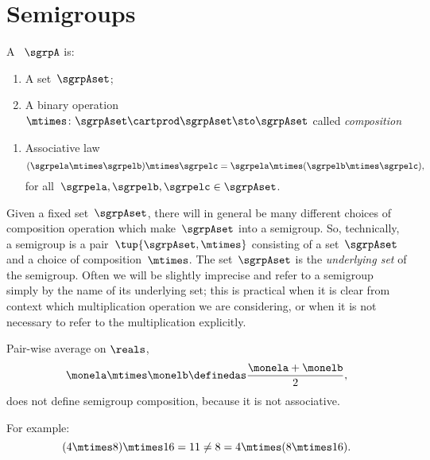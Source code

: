 
\section{Semigroups}
\label{sec:semigroups}

\begin{ctdefinition}[Semigroup]
    \label{def:semigroup}
    A \emph{}~$\sgrpA$ is:
    \begin{body}
        \constit
        \begin{enumerate}
            \item A set~$\sgrpAset$;
            \item A binary operation~$\mtimes  \colon \sgrpAset \cartprod \sgrpAset \sto \sgrpAset$ called \emph{composition}
        \end{enumerate}
        \condit
        \begin{enumerate}
            \item Associative law
                  \begin{equation}
                      \label{eq:semigroup-associative}
                      (\sgrpela \mtimes   \sgrpelb)\mtimes   \sgrpelc
                      = \sgrpela \mtimes   (\sgrpelb \mtimes  \sgrpelc),
                  \end{equation}
                  for all~$\sgrpela , \sgrpelb, \sgrpelc \in \sgrpAset$.
        \end{enumerate}
    \end{body}
\end{ctdefinition}

\begin{remark}
    Given a fixed set~$\sgrpAset$, there will in general be many different choices of composition operation which make~$\sgrpAset$ into a semigroup.
    So, technically, a semigroup is a pair~$\tup{\sgrpAset, \mtimes}$ consisting of a set~$\sgrpAset$ and a choice of composition~$\mtimes$.
    The set~$\sgrpAset$ is the \emph{underlying set} of the semigroup.
    Often we will be slightly imprecise and refer to a semigroup simply by the name of its underlying set;
    this is practical when it is clear from context which multiplication operation we are considering, or when it is not necessary to refer to the multiplication explicitly.
\end{remark}

\begin{example}
    Pair-wise average on $\reals$,
    \begin{equation}
        \label{eq:pairwise}
        \monela \mtimes \monelb \definedas  \frac{\monela + \monelb}{2},
    \end{equation}
    does not define semigroup composition, because it is not associative.

    For example:
    \begin{equation}
        \label{eq:pairwise-counterexample}
        (4 \mtimes 8) \mtimes 16 = 11 \neq  8 = 4 \mtimes (8 \mtimes 16).
    \end{equation}
\end{example}

